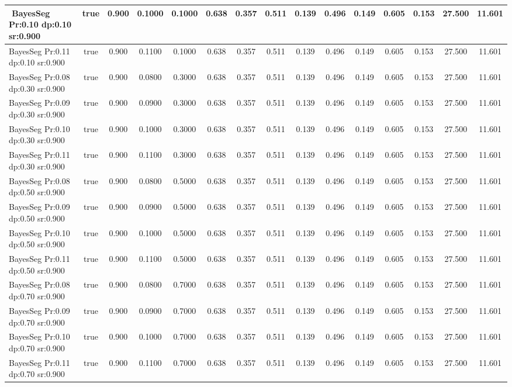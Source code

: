 \documentclass{article}
\begin{document}
\begin{longtable}[c]{|l|c|c|c|c|c|c|c|c|c|c|c|c|c|c|}
$$ BayesSeg Pr:0.10 dp:0.10 sr:0.900 & true & 0.900 & 0.1000 & 0.1000 & 0.638 & 0.357 & 0.511 & 0.139 & 0.496 & 0.149 & 0.605 & 0.153 & 27.500 & 11.601  \\ \hline 
 BayesSeg Pr:0.11 dp:0.10 sr:0.900 & true & 0.900 & 0.1100 & 0.1000 & 0.638 & 0.357 & 0.511 & 0.139 & 0.496 & 0.149 & 0.605 & 0.153 & 27.500 & 11.601  \\ \hline 
 BayesSeg Pr:0.08 dp:0.30 sr:0.900 & true & 0.900 & 0.0800 & 0.3000 & 0.638 & 0.357 & 0.511 & 0.139 & 0.496 & 0.149 & 0.605 & 0.153 & 27.500 & 11.601  \\ \hline 
 BayesSeg Pr:0.09 dp:0.30 sr:0.900 & true & 0.900 & 0.0900 & 0.3000 & 0.638 & 0.357 & 0.511 & 0.139 & 0.496 & 0.149 & 0.605 & 0.153 & 27.500 & 11.601  \\ \hline 
 BayesSeg Pr:0.10 dp:0.30 sr:0.900 & true & 0.900 & 0.1000 & 0.3000 & 0.638 & 0.357 & 0.511 & 0.139 & 0.496 & 0.149 & 0.605 & 0.153 & 27.500 & 11.601  \\ \hline 
 BayesSeg Pr:0.11 dp:0.30 sr:0.900 & true & 0.900 & 0.1100 & 0.3000 & 0.638 & 0.357 & 0.511 & 0.139 & 0.496 & 0.149 & 0.605 & 0.153 & 27.500 & 11.601  \\ \hline 
 BayesSeg Pr:0.08 dp:0.50 sr:0.900 & true & 0.900 & 0.0800 & 0.5000 & 0.638 & 0.357 & 0.511 & 0.139 & 0.496 & 0.149 & 0.605 & 0.153 & 27.500 & 11.601  \\ \hline 
 BayesSeg Pr:0.09 dp:0.50 sr:0.900 & true & 0.900 & 0.0900 & 0.5000 & 0.638 & 0.357 & 0.511 & 0.139 & 0.496 & 0.149 & 0.605 & 0.153 & 27.500 & 11.601  \\ \hline 
 BayesSeg Pr:0.10 dp:0.50 sr:0.900 & true & 0.900 & 0.1000 & 0.5000 & 0.638 & 0.357 & 0.511 & 0.139 & 0.496 & 0.149 & 0.605 & 0.153 & 27.500 & 11.601  \\ \hline 
 BayesSeg Pr:0.11 dp:0.50 sr:0.900 & true & 0.900 & 0.1100 & 0.5000 & 0.638 & 0.357 & 0.511 & 0.139 & 0.496 & 0.149 & 0.605 & 0.153 & 27.500 & 11.601  \\ \hline 
 BayesSeg Pr:0.08 dp:0.70 sr:0.900 & true & 0.900 & 0.0800 & 0.7000 & 0.638 & 0.357 & 0.511 & 0.139 & 0.496 & 0.149 & 0.605 & 0.153 & 27.500 & 11.601  \\ \hline 
 BayesSeg Pr:0.09 dp:0.70 sr:0.900 & true & 0.900 & 0.0900 & 0.7000 & 0.638 & 0.357 & 0.511 & 0.139 & 0.496 & 0.149 & 0.605 & 0.153 & 27.500 & 11.601  \\ \hline 
 BayesSeg Pr:0.10 dp:0.70 sr:0.900 & true & 0.900 & 0.1000 & 0.7000 & 0.638 & 0.357 & 0.511 & 0.139 & 0.496 & 0.149 & 0.605 & 0.153 & 27.500 & 11.601  \\ \hline 
 BayesSeg Pr:0.11 dp:0.70 sr:0.900 & true & 0.900 & 0.1100 & 0.7000 & 0.638 & 0.357 & 0.511 & 0.139 & 0.496 & 0.149 & 0.605 & 0.153 & 27.500 & 11.601  \\ \hline 
 \end{longtable} 
\end{document}
